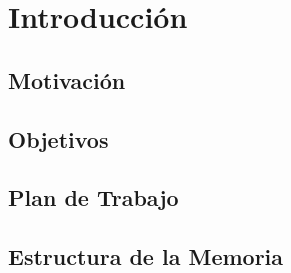 \newpage
\section {Introducción}
\subsection{Motivación}
\subsection{Objetivos}
\subsection{Plan de Trabajo}
\subsection{Estructura de la Memoria}
